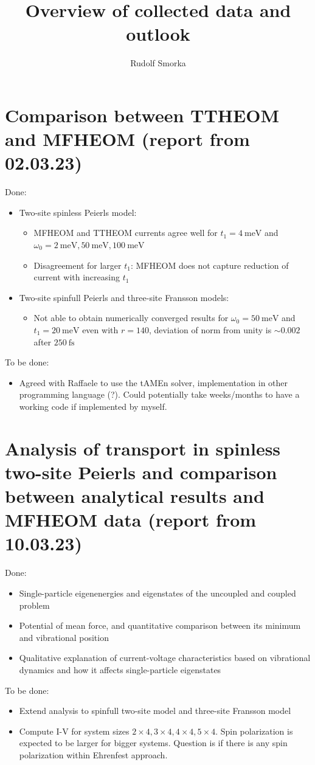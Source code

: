 \documentclass{article}
\begin{document}
\title{Overview of collected data and outlook}
\author{Rudolf Smorka}
\maketitle
\section{Comparison between TTHEOM and MFHEOM (report from 02.03.23)}
Done:
\begin{itemize}
	\item Two-site spinless Peierls model: 
	\begin{itemize}
		\item MFHEOM and TTHEOM currents agree well for $t_1=\SI{4}{\milli\electronvolt}$ and $\omega_0 = \SI{2}{\milli\electronvolt},\SI{50}{\milli\electronvolt}, \SI{100}{\milli\electronvolt}$
		\item Disagreement for larger $t_1$: MFHEOM does not capture reduction of current with increasing $t_1$
	\end{itemize}
	\item Two-site spinfull Peierls and three-site Fransson models:
	\begin{itemize}
		\item Not able to obtain numerically converged results for $\omega_0=\SI{50}{\milli\electronvolt}$ and $t_1=\SI{20}{\milli\electronvolt}$ even with $r=140$, deviation of norm from unity is $\sim 0.002$ after $\SI{250}{\femto\second}$
	\end{itemize}
\end{itemize}
To be done:
\begin{itemize}
	\item Agreed with Raffaele to use the tAMEn solver, implementation in other programming language (?). Could potentially take weeks/months to have a working code if implemented by myself. 
\end{itemize}
\section{Analysis of transport in spinless two-site Peierls and comparison between analytical results and MFHEOM data (report from 10.03.23)}
Done:
\begin{itemize}
	\item Single-particle eigenenergies and eigenstates of the uncoupled and coupled problem
	\item Potential of mean force, and quantitative comparison between its minimum and vibrational position
	\item Qualitative explanation of current-voltage characteristics based on vibrational dynamics and how it affects single-particle eigenstates
\end{itemize}
To be done:
\begin{itemize}
	\item Extend analysis to spinfull two-site model and three-site Fransson model
	\item Compute I-V for system sizes $2\times 4, 3\times 4,4\times 4,5\times 4$. Spin polarization is expected to be larger for bigger systems. Question is if there is any spin polarization within Ehrenfest approach.
\end{itemize}
\end{document}
